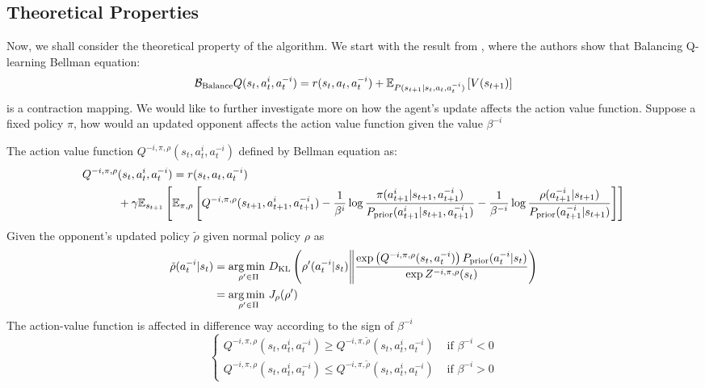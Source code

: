 \subsection{Theoretical Properties}
\label{sec:chap3-balancing-Q-theoretical}
Now, we shall consider the theoretical property of the algorithm. We start with the result from \cite{grau2018balancing}, where the authors show that Balancing Q-learning Bellman equation:
\begin{equation}
    \mathcal{B}_{\text{Balance}} Q(s_t, a^i_t, a^{-i}_t) = r(s_t, a_t, a^{-i}_t) + \mathbb{E}_{P(s_{t+1} | s_t, a_t, a^{-i}_t)}\left[ V(s_{t+1}) \right]
\end{equation}
is a contraction mapping. We would like to further investigate more on how the agent's update affects the action value function. Suppose a fixed policy $\pi$, how would an updated opponent affects the action value function given the value $\beta^{-i}$
\begin{theorem}
\label{thm:update-balance-opponent}
    The action value function $Q^{-i, \pi, \rho}(s_t, a^i_t, a^{-i}_t)$ defined by Bellman equation as:
    \begin{equation}
    \begin{aligned}
        Q^{-i, \pi, \rho}&(s_t, a^i_t, a^{-i}_t) = r(s_t, a_t, a^{-i}_t) \\
        &+ \gamma\mathbb{E}_{s_{t+1}}\left[ \mathbb{E}_{\pi, \rho}\left[ Q^{-i, \pi, \rho}(s_{t+1}, a^i_{t+1}, a^{-i}_{t+1}) - \frac{1}{\beta^i} \log\frac{\pi(a^i_{t+1}|s_{t+1}, a^{-i}_{t+1})}{P_{\text{prior}}(a^i_{t+1}|s_{t+1}, a^{-i}_{t+1})} - \frac{1}{\beta^{-i}}\log \frac{\rho(a^{-i}_{t+1}|s_{t+1})}{P_{\text{prior}}(a^{-i}_{t+1}|s_{t+1})} \right] \right]
    \end{aligned}
    \end{equation}
    Given the opponent's updated policy $\tilde{\rho}$ given normal policy $\rho$ as 
    \begin{equation}
    \begin{aligned}
        \tilde{\rho}(a^{-i}_t | s_t) &= \underset{\rho' \in \Pi}{\arg\min \ } D_{\mathrm{KL}} \left(  \rho'(a^{-i}_t | s_t) \Bigg\| \frac{\exp\left( Q^{-i, \pi, \rho}(s_t, a^{-i}_t) \right) P_{\text{prior}}(a^{-i}_t | s_t)}{\exp Z^{-i, \pi, \rho}(s_t)} \right) \\
        &=\underset{\rho' \in \Pi}{\arg\min \ } J_{\rho}(\rho')
    \end{aligned}
    \end{equation}
    The action-value function is affected in difference way according to the sign of $\beta^{-i}$
    \begin{equation}
    \begin{cases}
        Q^{-i, \pi, \rho}(s_t, a^i_t, a^{-i}_t) \ge Q^{-i, \pi, \tilde{\rho}}(s_t, a^i_t, a^{-i}_t) &\text{ if } \beta^{-i} < 0 \\
        Q^{-i, \pi, \rho}(s_t, a^i_t, a^{-i}_t) \le Q^{-i, \pi, \tilde{\rho}}(s_t, a^i_t, a^{-i}_t)&\text{ if } \beta^{-i} > 0
    \end{cases}
    \end{equation}
\end{theorem}
